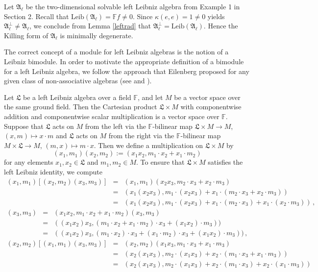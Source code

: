 \documentclass{amsart}
\numberwithin{equation}{section}
\newcommand{\leib}{\mathrm{Leib}}
\newcommand{\F}{\mathbb{F}}
\newcommand{\af}{\mathfrak{A}}
\newcommand{\lf}{\mathfrak{L}}
\begin{document}
 Let $\af_\ell$ be the two-dimensional solvable left Leibniz algebra from
Example 1 in Section 2. Recall that $\leib(\af_\ell)=\F f\ne 0$. Since $\kappa(e,e)=1\ne 0$ yields
$\af_\ell^\perp\ne\af_\ell$, we conclude from Lemma \ref{leftrad} that $\af_\ell^\perp=\leib
(\af_\ell)$. Hence the Killing form of $\af_\ell$ is minimally degenerate.
\vspace{.2cm}

The correct concept of a module for left Leibniz algebras is the notion of a Leibniz bimodule.
In order to motivate the appropriate definition of a bimodule for a left Leibniz algebra, we
follow the approach that Eilenberg proposed for any given class of non-associative algebras
(see \cite{E} and \cite[pp.\ 25/26]{S}).

Let $\lf$ be a left Leibniz algebra over a field $\F$, and let $M$ be a vector space over the
same ground field. Then the Cartesian product $\lf\times M$ with componentwise addition
and componentwise scalar multiplication is a vector space over $\F$. Suppose that $\lf$ acts
on $M$ from the left via the $\F$-bilinear map $\lf\times M\to M$, $(x,m)\mapsto x\cdot m$
and $\lf$ acts on $M$ from the right via the $\F$-bilinear map $M\times\lf\to M$, $(m,x)\mapsto
m\cdot x$. Then we define a multiplication on $\lf\times M$ by $$(x_1,m_1)(x_2,m_2):=(x_1x_2,
m_1\cdot x_2+x_1\cdot m_2)$$ for any elements $x_1,x_2\in\lf$ and $m_1,m_2\in M$. To
ensure that $\lf\times M$ satisfies the left Leibniz identity, we compute
\begin{eqnarray*}
(x_1,m_1)[(x_2,m_2)(x_3,m_3)] & = & (x_1,m_1)(x_2x_3,m_2\cdot x_3+x_2\cdot m_3)\\
& = & (x_1(x_2x_3),m_1\cdot(x_2x_3)+x_1\cdot(m_2\cdot x_3+x_2\cdot m_3))\\
& = & (x_1(x_2x_3),m_1\cdot(x_2x_3)+x_1\cdot(m_2\cdot x_3)+x_1\cdot(x_2\cdot m_3))\,,
\end{eqnarray*}
\begin{eqnarray*}
[(x_1,m_1)(x_2,m_2)](x_3,m_3) & = & (x_1x_2,m_1\cdot x_2+x_1\cdot m_2)(x_3,m_3)\\
& = & ((x_1x_2)x_3,(m_1\cdot x_2+x_1\cdot m_2)\cdot x_3+(x_1x_2)\cdot m_3))\\
& = & ((x_1x_2)x_3,(m_1\cdot x_2)\cdot x_3+(x_1\cdot m_2)\cdot x_3+(x_1x_2)\cdot m_3))\,,
\end{eqnarray*}
\begin{eqnarray*}
(x_2,m_2)[(x_1,m_1)(x_3,m_3)] & = & (x_2,m_2)(x_1x_3,m_1\cdot x_3+x_1\cdot m_3)\\
& = & (x_2(x_1x_3),m_2\cdot(x_1x_3)+x_2\cdot(m_1\cdot x_3+x_1\cdot m_3))\\
& = & (x_2(x_1x_3),m_2\cdot(x_1x_3)+x_2\cdot(m_1\cdot x_3)+x_2\cdot(x_1\cdot m_3))
\end{eqnarray*}
\end{document}
